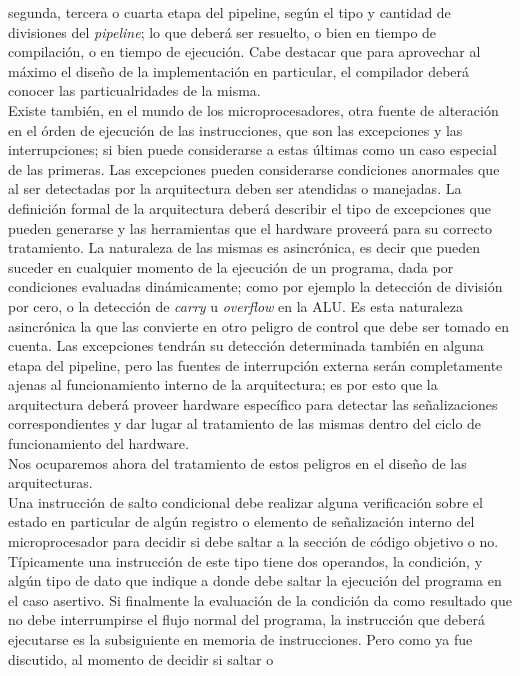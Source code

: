 segunda, tercera o cuarta etapa del pipeline, según el tipo y cantidad de 
divisiones del \emph{pipeline}; lo que deberá ser resuelto, o bien en tiempo de 
compilación, o en tiempo de ejecución. Cabe destacar que para aprovechar al 
máximo el diseño de la implementación en particular, el compilador deberá 
conocer las particualridades de la misma.\\
Existe también, en el mundo de los microprocesadores, otra fuente de alteración 
en el órden de ejecución de las instrucciones, que son las excepciones y las 
interrupciones; si bien puede considerarse a estas últimas como un caso especial 
de las primeras. Las excepciones pueden considerarse condiciones anormales que 
al ser detectadas por la arquitectura deben ser atendidas o manejadas. La 
definición formal de la arquitectura deberá describir el tipo de excepciones 
que pueden generarse y las herramientas que el hardware proveerá para su 
correcto tratamiento. La naturaleza de las mismas es asincrónica, es decir que 
pueden suceder en cualquier momento de la ejecución de un programa, dada por 
condiciones evaluadas dinámicamente; como por ejemplo la detección de división 
por cero, o la detección de \emph{carry} u \emph{overflow} en la ALU. Es esta 
naturaleza asincrónica la que las convierte en otro peligro de control que debe 
ser tomado en cuenta. Las excepciones tendrán su detección determinada también 
en alguna etapa del pipeline, pero las fuentes de interrupción externa serán 
completamente ajenas al funcionamiento interno de la arquitectura; es por esto 
que la arquitectura deberá proveer hardware específico para detectar las 
señalizaciones correspondientes y dar lugar al tratamiento de las mismas dentro 
del ciclo de funcionamiento del hardware.\\
Nos ocuparemos ahora del tratamiento de estos peligros en el diseño de las 
arquitecturas.\\
Una instrucción de salto condicional debe realizar alguna verificación sobre el 
estado en particular de algún registro o elemento de señalización interno del 
microprocesador para decidir si debe saltar a la sección de código objetivo o 
no. Típicamente una instrucción de este tipo tiene dos operandos, la condición, 
y algún tipo de dato que indique a donde debe saltar la ejecución del programa 
en el caso asertivo. Si finalmente la evaluación de la condición da como 
resultado que no debe interrumpirse el flujo normal del programa, la 
instrucción que deberá ejecutarse es la subsiguiente en memoria de 
instrucciones. Pero como ya fue discutido, al momento de decidir si saltar o 

